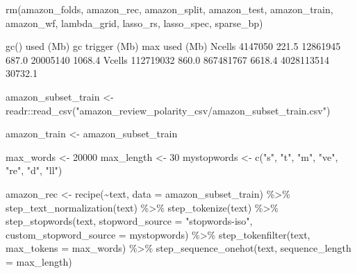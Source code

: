 \documentclass[
]{article}
\newenvironment{Shaded}{}{}
\newcommand{\AttributeTok}[1]{\textcolor[rgb]{0.49,0.56,0.16}{#1}}
\newcommand{\DecValTok}[1]{\textcolor[rgb]{0.25,0.63,0.44}{#1}}
\newcommand{\FloatTok}[1]{\textcolor[rgb]{0.25,0.63,0.44}{#1}}
\newcommand{\FunctionTok}[1]{\textcolor[rgb]{0.02,0.16,0.49}{#1}}
\newcommand{\NormalTok}[1]{#1}
\newcommand{\OtherTok}[1]{\textcolor[rgb]{0.00,0.44,0.13}{#1}}
\newcommand{\SpecialCharTok}[1]{\textcolor[rgb]{0.25,0.44,0.63}{#1}}
\newcommand{\StringTok}[1]{\textcolor[rgb]{0.25,0.44,0.63}{#1}}
\begin{document}
\begin{Shaded}
\begin{Highlighting}[]
\FunctionTok{rm}\NormalTok{(amazon\_folds, amazon\_rec, amazon\_split, amazon\_test, amazon\_train, amazon\_wf,}
\NormalTok{    lambda\_grid, lasso\_rs, lasso\_spec, sparse\_bp)}

\FunctionTok{gc}\NormalTok{()}
            \FunctionTok{used}\NormalTok{  (Mb) gc }\FunctionTok{trigger}\NormalTok{   (Mb)   max }\FunctionTok{used}\NormalTok{    (Mb)}
\NormalTok{Ncells   }\DecValTok{4147050} \FloatTok{221.5}   \DecValTok{12861945}  \FloatTok{687.0}   \DecValTok{20005140}  \FloatTok{1068.4}
\NormalTok{Vcells }\DecValTok{112719032} \FloatTok{860.0}  \DecValTok{867481767} \FloatTok{6618.4} \DecValTok{4028113514} \FloatTok{30732.1}

\NormalTok{amazon\_subset\_train }\OtherTok{\textless{}{-}}\NormalTok{ readr}\SpecialCharTok{::}\FunctionTok{read\_csv}\NormalTok{(}\StringTok{"amazon\_review\_polarity\_csv/amazon\_subset\_train.csv"}\NormalTok{)}

\NormalTok{amazon\_train }\OtherTok{\textless{}{-}}\NormalTok{ amazon\_subset\_train}

\NormalTok{max\_words }\OtherTok{\textless{}{-}} \DecValTok{20000}
\NormalTok{max\_length }\OtherTok{\textless{}{-}} \DecValTok{30}
\NormalTok{mystopwords }\OtherTok{\textless{}{-}} \FunctionTok{c}\NormalTok{(}\StringTok{"s"}\NormalTok{, }\StringTok{"t"}\NormalTok{, }\StringTok{"m"}\NormalTok{, }\StringTok{"ve"}\NormalTok{, }\StringTok{"re"}\NormalTok{, }\StringTok{"d"}\NormalTok{, }\StringTok{"ll"}\NormalTok{)}

\NormalTok{amazon\_rec }\OtherTok{\textless{}{-}} \FunctionTok{recipe}\NormalTok{(}\SpecialCharTok{\textasciitilde{}}\NormalTok{text, }\AttributeTok{data =}\NormalTok{ amazon\_subset\_train) }\SpecialCharTok{\%\textgreater{}\%}
    \FunctionTok{step\_text\_normalization}\NormalTok{(text) }\SpecialCharTok{\%\textgreater{}\%}
    \FunctionTok{step\_tokenize}\NormalTok{(text) }\SpecialCharTok{\%\textgreater{}\%}
    \FunctionTok{step\_stopwords}\NormalTok{(text, }\AttributeTok{stopword\_source =} \StringTok{"stopwords{-}iso"}\NormalTok{, }\AttributeTok{custom\_stopword\_source =}\NormalTok{ mystopwords) }\SpecialCharTok{\%\textgreater{}\%}
    \FunctionTok{step\_tokenfilter}\NormalTok{(text, }\AttributeTok{max\_tokens =}\NormalTok{ max\_words) }\SpecialCharTok{\%\textgreater{}\%}
    \FunctionTok{step\_sequence\_onehot}\NormalTok{(text, }\AttributeTok{sequence\_length =}\NormalTok{ max\_length)}


\end{Highlighting}
\end{Shaded}
\end{document}
